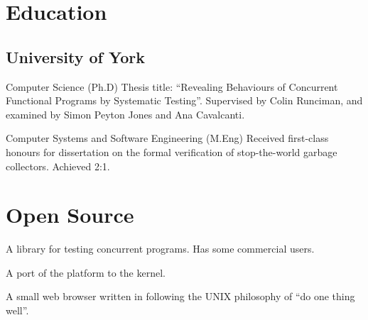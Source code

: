 \section{Education}

\subsection{University of York}

  {Computer Science (Ph.D)}
  {Thesis title: ``Revealing Behaviours of Concurrent Functional Programs by Systematic Testing''.  Supervised by Colin Runciman, and examined by Simon Peyton Jones and Ana Cavalcanti.}

  {Computer Systems and Software Engineering (M.Eng)}
  {Received first-class honours for dissertation on the formal
    verification of stop-the-world garbage collectors.  Achieved 2:1.}


\section{Open Source}

  {A library for testing concurrent  programs. Has some
    commercial users.}

  {A port of the  platform to the 
    kernel.}

  {A small web browser written in  following the UNIX
    philosophy of ``do one thing well''.}


